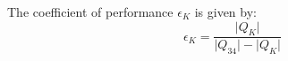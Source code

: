 The coefficient of performance \( \epsilon_K \) is given by:  
\[
\epsilon_K = \frac{\lvert Q_K \rvert}{\lvert Q_{34} \rvert - \lvert Q_K \rvert}
\]